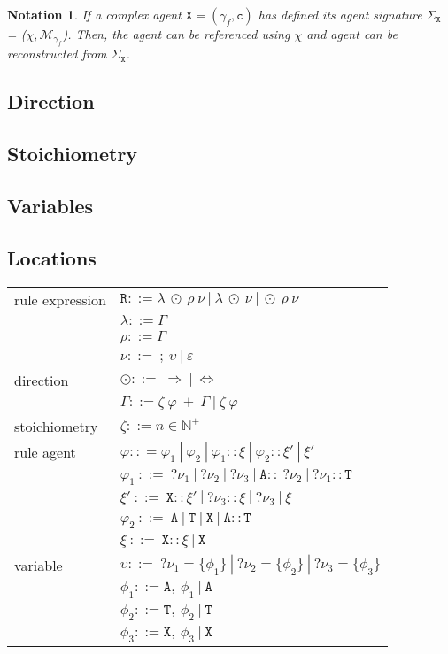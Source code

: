 \documentclass{entcs}
\renewcommand{\~}[0]{\texttildelow}
\newtheorem{notation}[thm]{Notation}
\begin{document}
\begin{notation}
If a complex agent $\mathtt{X} = (\gamma_f, \mathtt{c})$ has defined its agent signature $\Sigma_\mathtt{X}$ = ($\chi, \mathcal{M}_{\gamma_f}$). Then, the agent can be referenced using $\chi$ and agent can be reconstructed from $\Sigma_\mathtt{X}$.
\end{notation}

\subsection{Direction}

\subsection{Stoichiometry}

\subsection{Variables}

\subsection{Locations}

\begin{center}
{\small
\hspace*{-1cm}\begin{tabular}{ l l }
 rule expression & $\mathtt{R} ::= \lambda ~\odot~ \rho~\nu ~|~ \lambda ~\odot~\nu ~|~ \odot~ \rho~\nu $\\
  & $\lambda ::= \Gamma$\\
  & $\rho ::= \Gamma$\\
  & $\nu ::=~ ;~\upsilon ~|~ \varepsilon$\\
 direction & $\odot ::=~ \Rightarrow~|~\Leftrightarrow $\\
  & $\Gamma ::= \zeta~\varphi~ +~\Gamma ~|~ \zeta~\varphi$\\
 stoichiometry & $\zeta ::= n \in \mathbb{N}^+$\\
 rule agent & $\varphi :: = \varphi_1~|~\varphi_2~|~\varphi_1::\xi~|~\varphi_2::\xi'~|~\xi'$\\
  & $\varphi_1  ~::=~  ?\nu_1~|~?\nu_2~|~?\nu_3~|~\mathtt{A}::~?\nu_2~|~?\nu_1::\mathtt{T}$\\
  & $\xi' ~::=~ \mathtt{X}::\xi'~|~?\nu_3::\xi~|~?\nu_3~|~\xi$\\
  & $\varphi_2  ~::=~  \mathtt{A}~|~\mathtt{T}~|~\mathtt{X}~|~\mathtt{A}::\mathtt{T}$\\
  & $\xi  ~::=~  \mathtt{X}::\xi~|~\mathtt{X}$\\
 variable & $\upsilon ::=~?\nu_1=\{\phi_1\}~|~?\nu_2=\{\phi_2\}~|~?\nu_3=\{\phi_3\}$\\
  & $\phi_1 ::= \mathtt{A},~\phi_1~|~\mathtt{A}$\\
  & $\phi_2 ::= \mathtt{T},~\phi_2~|~\mathtt{T}$\\
  & $\phi_3 ::= \mathtt{X},~\phi_3~|~\mathtt{X}$\\
\end{tabular}
}
\end{center}
\end{document}
